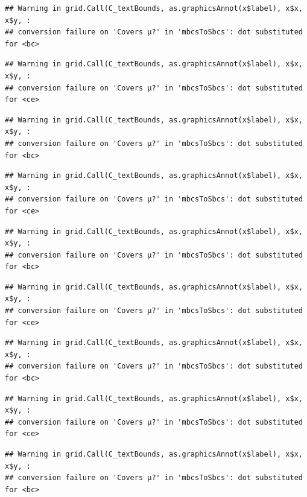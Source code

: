 \documentclass[
]{book}
\begin{document}
\begin{verbatim}
## Warning in grid.Call(C_textBounds, as.graphicsAnnot(x$label), x$x, x$y, :
## conversion failure on 'Covers μ?' in 'mbcsToSbcs': dot substituted for <bc>
\end{verbatim}

\begin{verbatim}
## Warning in grid.Call(C_textBounds, as.graphicsAnnot(x$label), x$x, x$y, :
## conversion failure on 'Covers μ?' in 'mbcsToSbcs': dot substituted for <ce>
\end{verbatim}

\begin{verbatim}
## Warning in grid.Call(C_textBounds, as.graphicsAnnot(x$label), x$x, x$y, :
## conversion failure on 'Covers μ?' in 'mbcsToSbcs': dot substituted for <bc>
\end{verbatim}

\begin{verbatim}
## Warning in grid.Call(C_textBounds, as.graphicsAnnot(x$label), x$x, x$y, :
## conversion failure on 'Covers μ?' in 'mbcsToSbcs': dot substituted for <ce>
\end{verbatim}

\begin{verbatim}
## Warning in grid.Call(C_textBounds, as.graphicsAnnot(x$label), x$x, x$y, :
## conversion failure on 'Covers μ?' in 'mbcsToSbcs': dot substituted for <bc>
\end{verbatim}

\begin{verbatim}
## Warning in grid.Call(C_textBounds, as.graphicsAnnot(x$label), x$x, x$y, :
## conversion failure on 'Covers μ?' in 'mbcsToSbcs': dot substituted for <ce>
\end{verbatim}

\begin{verbatim}
## Warning in grid.Call(C_textBounds, as.graphicsAnnot(x$label), x$x, x$y, :
## conversion failure on 'Covers μ?' in 'mbcsToSbcs': dot substituted for <bc>
\end{verbatim}

\begin{verbatim}
## Warning in grid.Call(C_textBounds, as.graphicsAnnot(x$label), x$x, x$y, :
## conversion failure on 'Covers μ?' in 'mbcsToSbcs': dot substituted for <ce>
\end{verbatim}

\begin{verbatim}
## Warning in grid.Call(C_textBounds, as.graphicsAnnot(x$label), x$x, x$y, :
## conversion failure on 'Covers μ?' in 'mbcsToSbcs': dot substituted for <bc>
\end{verbatim}
\end{document}
